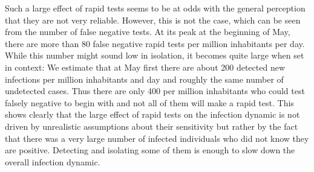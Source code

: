 Such a large effect of rapid tests seems to be at odds with the general perception that
they are not very reliable. However, this is not the case, which can be seen from the
number of
false negative tests. At its peak at the beginning of May, there are more than 80 false
negative rapid tests per million inhabitants per day. While this number might sound low
in isolation, it becomes quite large when set in context: We estimate that at May first
there are about 200 detected new infections per million inhabitants and day and roughly
the same number of undetected cases. Thus there are only 400 per million inhabitants
who could test falsely negative to begin with and not all of them will make a rapid
test. This shows clearly that the large effect of rapid tests on the infection dynamic
is not driven by unrealistic assumptions about their sensitivity but rather by the
fact that there was a very large number of infected individuals who did not know they
are positive. Detecting and isolating some of them is enough to slow down the
overall infection dynamic.

